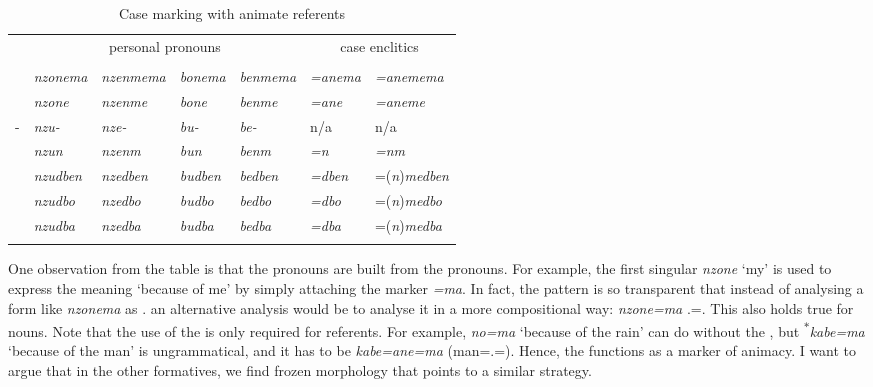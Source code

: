 \begin{table}
\begin{center}
\caption{Case marking with animate referents} 
\label{casediscussionss} 
	\begin{tabularx}{\textwidth}{Xllllll}	
		\lsptoprule
		&\multicolumn{4}{c}{{personal pronouns}}&\multicolumn{2}{c}{{case enclitics}}\\
		&\Fsg{}&{\Fnsg}&\Ssg{}&\Snsg{}&{\Sg}&{\Nsg}\\ \midrule
		{\Char}&\emph{nzonema}&\emph{nzenmema}&\emph{bonema}&\emph{benmema}&\emph{=anema}&\emph{=anemema}\\
		{\Poss}&\emph{nzone}&\emph{nzenme}&\emph{bone}&\emph{benme}&\emph{=ane}&\emph{=aneme}\\ 
		\Poss-&\emph{nzu-}&\emph{nze-}&\emph{bu-}&\emph{be-}&n/a&n/a\\ 
		{\Dat}&\emph{nzun}&\emph{nzenm}&\emph{bun}&\emph{benm}&\emph{=n}&\emph{=nm}\\ 
		{\Loc}&\emph{nzudben}&\emph{nzedben}&\emph{budben}&\emph{bedben}&\emph{=dben}&=(\emph{n})\emph{medben}\\ 
		{\All}&\emph{nzudbo}&\emph{nzedbo}&\emph{budbo}&\emph{bedbo}&\emph{=dbo}&=(\emph{n})\emph{medbo}\\ 
		{\Abl}&\emph{nzudba}&\emph{nzedba}&\emph{budba}&\emph{bedba}&\emph{=dba}&=(\emph{n})\emph{medba}\\ 
		\lspbottomrule
	\end{tabularx}
\end{center}
\end{table}%

One observation from the table is that the  pronouns are built from the  pronouns. For example, the first singular  \emph{nzone} `my' is used to express the meaning `because of me' by simply attaching the   marker \emph{=ma}. In fact, the pattern is so transparent that instead of analysing a form like \emph{nzonema} as \Fsg.{\Char} an alternative analysis would be to analyse it in a more compositional way: \emph{nzone=ma} \Fsg.\Poss={\Char}. This also holds true for nouns. Note that the use of the  is only required for  referents. For example, \emph{no=ma} `because of the rain' can do without the , but \textsuperscript{$\ast$}\emph{kabe=ma} `because of the man' is ungrammatical, and it has to be \emph{kabe=ane=ma} (man=\Poss.\Sg=\Char). Hence, the  functions as a marker of animacy. I want to argue that in the other  formatives, we find frozen morphology that points to a similar strategy.

